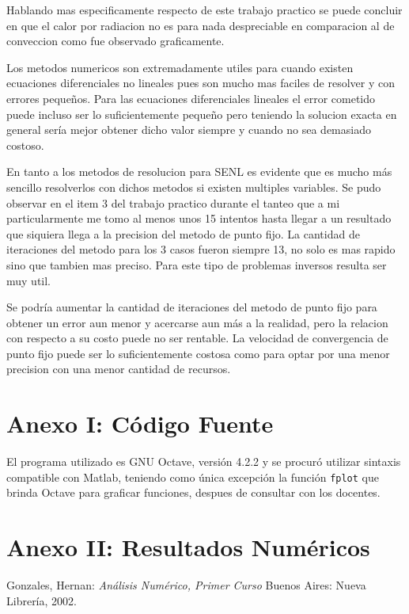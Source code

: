 \documentclass[11pt,a4paper]{article}
\begin{document}
Hablando mas especificamente respecto de este trabajo practico se puede concluir en que el calor por radiacion no es para nada despreciable en comparacion al de conveccion como fue observado graficamente.

Los metodos numericos son extremadamente utiles para cuando existen ecuaciones diferenciales no lineales pues son mucho mas faciles de resolver y con errores pequeños. Para las ecuaciones diferenciales lineales el error cometido puede incluso ser lo suficientemente pequeño pero teniendo la solucion exacta en general sería mejor obtener dicho valor siempre y cuando no sea demasiado costoso.

En tanto a los metodos de resolucion para SENL es evidente que es mucho más sencillo resolverlos con dichos metodos si existen multiples variables. Se pudo observar en el item 3 del trabajo practico durante el tanteo que a mi particularmente me tomo al menos unos 15 intentos hasta llegar a un resultado que siquiera llega a la precision del metodo de punto fijo. La cantidad de iteraciones del metodo para los 3 casos fueron siempre 13, no solo es mas rapido sino que tambien mas preciso. Para este tipo de problemas inversos resulta ser muy util.

Se podría aumentar la cantidad de iteraciones del metodo de punto fijo para obtener un error aun menor y acercarse aun más a la realidad, pero la relacion con respecto a su costo puede no ser rentable. La velocidad de convergencia de punto fijo puede ser lo suficientemente costosa como para optar por una menor precision con una menor cantidad de recursos.

\newpage
\appendix
\section{Anexo I: Código Fuente}

El programa utilizado es GNU Octave, versión 4.2.2 y se procuró utilizar sintaxis compatible con Matlab, teniendo como única excepción la función \texttt{fplot} que brinda Octave para graficar funciones, despues de consultar con los docentes.


\newpage


\newpage
\section{Anexo II: Resultados Numéricos}


{}
\renewcommand\refname{Bibliografía}
\begin{thebibliography}{9}

Gonzales, Hernan: 
\textit{Análisis Numérico, Primer Curso}
Buenos Aires: Nueva Librería, 2002.

\end{thebibliography}
\end{document}
